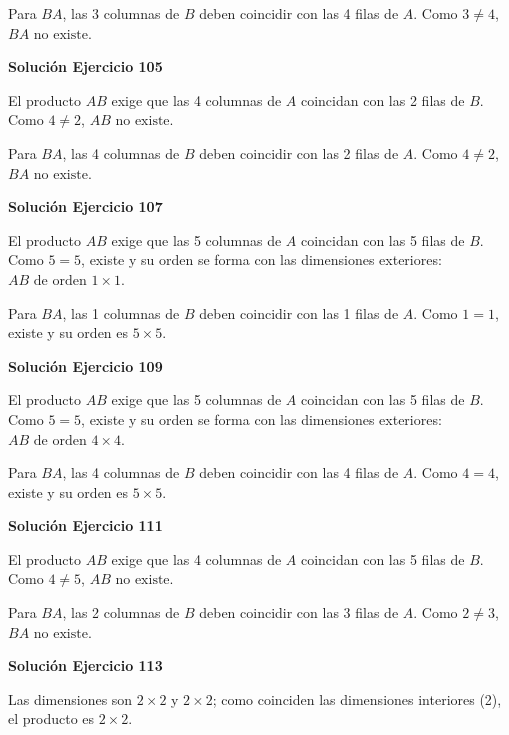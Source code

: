 \documentclass[12pt]{article}
\theoremstyle{remark}
\begin{document}
Para $BA$, las 3 columnas de $B$ deben coincidir con las 4 filas de $A$. Como $3\neq4$, $\boxed{BA\text{ no existe}}$.


\par\bigskip\noindent\textbf{Solución Ejercicio 105}\par\nobreak
El producto $AB$ exige que las 4 columnas de $A$ coincidan con las 2 filas de $B$. Como $4\neq2$, $\boxed{AB\text{ no existe}}$.

Para $BA$, las 4 columnas de $B$ deben coincidir con las 2 filas de $A$. Como $4\neq2$, $\boxed{BA\text{ no existe}}$.


\par\bigskip\noindent\textbf{Solución Ejercicio 107}\par\nobreak
El producto $AB$ exige que las 5 columnas de $A$ coincidan con las 5 filas de $B$. Como $5=5$, existe y su orden se forma con las dimensiones exteriores: $\boxed{AB\text{ de orden } 1\times 1}$.

Para $BA$, las 1 columnas de $B$ deben coincidir con las 1 filas de $A$. Como $1=1$, existe y su orden es $\boxed{5\times 5}$.


\par\bigskip\noindent\textbf{Solución Ejercicio 109}\par\nobreak
El producto $AB$ exige que las 5 columnas de $A$ coincidan con las 5 filas de $B$. Como $5=5$, existe y su orden se forma con las dimensiones exteriores: $\boxed{AB\text{ de orden } 4\times 4}$.

Para $BA$, las 4 columnas de $B$ deben coincidir con las 4 filas de $A$. Como $4=4$, existe y su orden es $\boxed{5\times 5}$.


\par\bigskip\noindent\textbf{Solución Ejercicio 111}\par\nobreak
El producto $AB$ exige que las 4 columnas de $A$ coincidan con las 5 filas de $B$. Como $4\neq5$, $\boxed{AB\text{ no existe}}$.

Para $BA$, las 2 columnas de $B$ deben coincidir con las 3 filas de $A$. Como $2\neq3$, $\boxed{BA\text{ no existe}}$.


\par\bigskip\noindent\textbf{Solución Ejercicio 113}\par\nobreak
Las dimensiones son $2\times2$ y $2\times2$; como coinciden las dimensiones interiores (2), el producto es $2\times2$.
\end{document}
